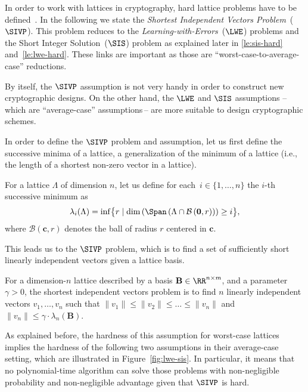 In order to work with lattices in cryptography, hard lattice problems have to be defined~\cite{Ajt96}.
In the following we state the \textit{Shortest Independent Vectors Problem}~($\SIVP$).
This problem reduces to the \textit{Learning-with-Errors}~($\LWE$) problems and the Short Integer Solution~($\SIS$) problem as explained later in \cref{le:sis-hard} and~\ref{le:lwe-hard}.
These links are important as those are ``worst-case-to-average-case'' reductions.

By itself, the $\SIVP$ assumption is not very handy in order to construct new cryptographic designs.
On the other hand, the $\LWE$ and $\SIS$ assumptions --\,which are ``average-case'' assumptions\,-- are more suitable to design cryptographic schemes.

In order to define the $\SIVP$ problem and assumption, let us first define the successive minima of a lattice, a generalization of the minimum of a lattice (i.e., the length of a shortest non-zero vector in a lattice).

\begin{definition} \label{de:lattice-lambda}
  For a lattice $\Lambda$ of dimension $n$, let us define for each~$i \in \{1,\ldots,n\}$ the $i$-th successive minimum as
  \[ \lambda_i(\Lambda) = \inf \bigl\{ r \mid \dim \left( \Span\left(\Lambda \cap \mathcal B\left(\mathbf{0}, r \right) \right)  \right) \geq i \bigr\}, \]
  where $\mathcal B(\mathbf{c}, r)$ denotes the ball of radius $r$ centered in $\mathbf{c}$.
\end{definition}

This leads us to the $\SIVP$ problem, which is to find a set of sufficiently short linearly independent vectors given a lattice basis.

\begin{definition}[$\SIVP$] \label{de:sivp}
  For a dimension-$n$ lattice described by a basis $\mathbf{B} \in \RR^{n \times m}$, and a parameter $\gamma > 0$, the shortest independent vectors problem is to find $n$ linearly independent vectors $v_1, \ldots, v_n$ such that $\| v_1 \| \leq \| v_2 \| \leq \ldots \leq \| v_n \|$ and $\|v_n\| \leq \gamma \cdot \lambda_n(\mathbf{B})$.
\end{definition}

As explained before, the hardness of this assumption for worst-case lattices implies the hardness of the following two assumptions in their average-case setting, which are illustrated in Figure~\ref{fig:lwe-sis}.
In particular, it means that no polynomial-time algorithm can solve those problems with non-negligible probability and non-negligible advantage given that $\SIVP$ is hard.

